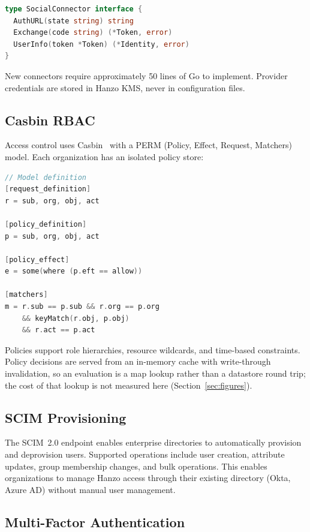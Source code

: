 \documentclass[11pt,twocolumn]{article}
\begin{document}
\begin{lstlisting}[language=Go]
type SocialConnector interface {
  AuthURL(state string) string
  Exchange(code string) (*Token, error)
  UserInfo(token *Token) (*Identity, error)
}
\end{lstlisting}

New connectors require approximately 50 lines of Go to implement. Provider credentials are stored in Hanzo KMS, never in configuration files.

\subsection{Casbin RBAC}

Access control uses Casbin~\cite{casbin2019} with a PERM (Policy, Effect, Request, Matchers) model. Each organization has an isolated policy store:

\begin{lstlisting}[language=Go]
// Model definition
[request_definition]
r = sub, org, obj, act

[policy_definition]
p = sub, org, obj, act

[policy_effect]
e = some(where (p.eft == allow))

[matchers]
m = r.sub == p.sub && r.org == p.org
    && keyMatch(r.obj, p.obj)
    && r.act == p.act
\end{lstlisting}

Policies support role hierarchies, resource wildcards, and time-based constraints. Policy decisions are served from an in-memory cache with write-through invalidation, so an evaluation is a map lookup rather than a datastore round trip; the cost of that lookup is not measured here (Section~\ref{sec:figures}).

\subsection{SCIM Provisioning}

The SCIM~2.0 endpoint enables enterprise directories to automatically provision and deprovision users. Supported operations include user creation, attribute updates, group membership changes, and bulk operations. This enables organizations to manage Hanzo access through their existing directory (Okta, Azure AD) without manual user management.

\subsection{Multi-Factor Authentication}
\end{document}
